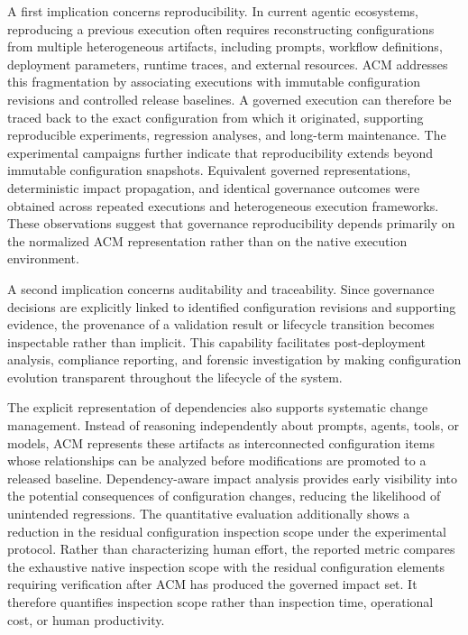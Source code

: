 \documentclass[10pt]{article}
\begin{document}
A first implication concerns reproducibility. In current agentic ecosystems, reproducing a previous execution often requires reconstructing configurations from multiple heterogeneous artifacts, including prompts, workflow definitions, deployment parameters, runtime traces, and external resources. ACM addresses this fragmentation by associating executions with immutable configuration revisions and controlled release baselines. A governed execution can therefore be traced back to the exact configuration from which it originated, supporting reproducible experiments, regression analyses, and long-term maintenance. The experimental campaigns further indicate that reproducibility extends beyond immutable configuration snapshots. Equivalent governed representations, deterministic impact propagation, and identical governance outcomes were obtained across repeated executions and heterogeneous execution frameworks. These observations suggest that governance reproducibility depends primarily on the normalized ACM representation rather than on the native execution environment.

A second implication concerns auditability and traceability. Since governance decisions are explicitly linked to identified configuration revisions and supporting evidence, the provenance of a validation result or lifecycle transition becomes inspectable rather than implicit. This capability facilitates post-deployment analysis, compliance reporting, and forensic investigation by making configuration evolution transparent throughout the lifecycle of the system.

The explicit representation of dependencies also supports systematic change management. Instead of reasoning independently about prompts, agents, tools, or models, ACM represents these artifacts as interconnected configuration items whose relationships can be analyzed before modifications are promoted to a released baseline. Dependency-aware impact analysis provides early visibility into the potential consequences of configuration changes, reducing the likelihood of unintended regressions. The quantitative evaluation additionally shows a reduction in the residual configuration inspection scope under the experimental protocol. Rather than characterizing human effort, the reported metric compares the exhaustive native inspection scope with the residual configuration elements requiring verification after ACM has produced the governed impact set. It therefore quantifies inspection scope rather than inspection time, operational cost, or human productivity.
\end{document}
